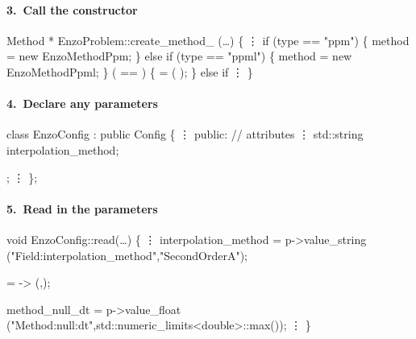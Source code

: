 
\begin{frame}[fragile] 
\secframetitle{\ssDevelMethod}
\framesubtitle{3.~Call the  constructor}

\footnotesize
\begin{semiverbatim}
   Method * EnzoProblem::create_method_ (\dots)
   \{
         \vdots
      if (type == "ppm") \{
          method = new EnzoMethodPpm;
      \} else if (type == "ppml") \{
          method = new EnzoMethodPpml;
      \}  ( == ) \{
           =  
             (
              );
      \} else if
         \vdots
   \}
\end{semiverbatim}

\end{frame}


\begin{frame}[fragile, label=ss-devel-parameters] 
\secframetitle{\ssDevelMethod}
\framesubtitle{4.~Declare any  parameters}

\footnotesize
\begin{semiverbatim}
   class EnzoConfig : public Config \{
        \vdots 
   public: // attributes
        \vdots
     std::string      interpolation_method;

                ;
        \vdots 
   \};
\end{semiverbatim}

\end{frame}


\begin{frame}[fragile] 
\secframetitle{\ssDevelMethod}
\framesubtitle{5.~Read in the  parameters}

\footnotesize
\begin{semiverbatim}
   void EnzoConfig::read(\dots)
   \{
        \vdots
      interpolation_method = p->value_string 
        ("Field:interpolation_method","SecondOrderA");

       = ->
        (,);

      method_null_dt = p->value_float 
        ("Method:null:dt",std::numeric_limits<double>::max());
        \vdots
   \}
\end{semiverbatim}

\end{frame}

